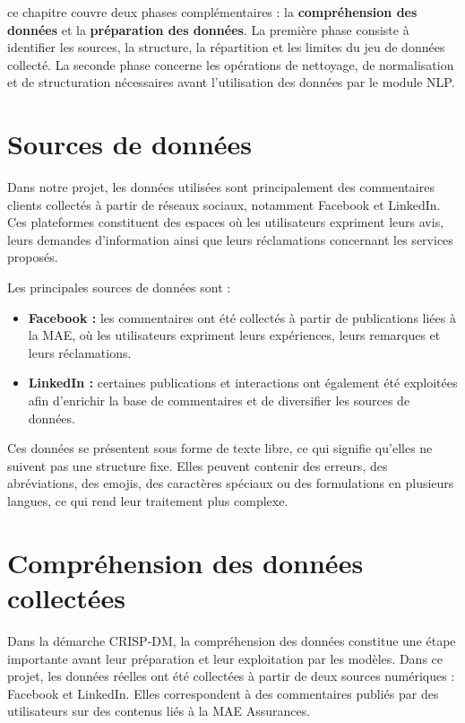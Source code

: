\documentclass[12pt,a4paper,oneside]{report}
\begin{document}
ce chapitre couvre deux phases complémentaires : la \textbf{compréhension des données} et la \textbf{préparation des données}. La première phase consiste à identifier les sources, la structure, la répartition et les limites du jeu de données collecté. La seconde phase concerne les opérations de nettoyage, de normalisation et de structuration nécessaires avant l'utilisation des données par le module NLP.

\vspace{-0.5cm}
\section{Sources de données}
Dans notre projet, les données utilisées sont principalement des commentaires clients collectés à partir de réseaux sociaux, notamment Facebook et LinkedIn. Ces plateformes constituent des espaces où les utilisateurs expriment leurs avis, leurs demandes d’information ainsi que leurs réclamations concernant les services proposés.

Les principales sources de données sont :

\begin{itemize}
    \item \textbf{Facebook :} les commentaires ont été collectés à partir de publications liées à la MAE, où les utilisateurs expriment leurs expériences, leurs remarques et leurs réclamations.
    \item \textbf{LinkedIn :} certaines publications et interactions ont également été exploitées afin d’enrichir la base de commentaires et de diversifier les sources de données.
\end{itemize}

Ces données se présentent sous forme de texte libre, ce qui signifie qu’elles ne suivent pas une structure fixe. Elles peuvent contenir des erreurs, des abréviations, des emojis, des caractères spéciaux ou des formulations en plusieurs langues, ce qui rend leur traitement plus complexe.

\section{Compréhension des données collectées}

Dans la démarche CRISP-DM, la compréhension des données constitue une étape
importante avant leur préparation et leur exploitation par les modèles. Dans
ce projet, les données réelles ont été collectées à partir de deux sources
numériques : Facebook et LinkedIn. Elles correspondent à des commentaires
publiés par des utilisateurs sur des contenus liés à la MAE Assurances.
\end{document}
